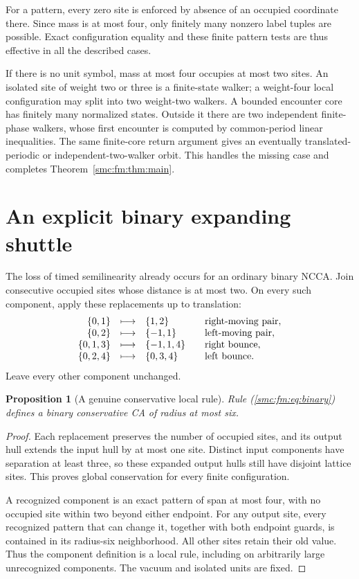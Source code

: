 \documentclass[11pt,letterpaper]{article}
\numberwithin{equation}{section}
\newtheorem{proposition}[theorem]{Proposition}
\theoremstyle{definition}
\theoremstyle{remark}
\begin{document}
For a pattern, every zero site is enforced by absence of an occupied coordinate
there. Since mass is at most four, only finitely many nonzero label tuples are
possible. Exact configuration equality and these finite pattern tests are thus
effective in all the described cases.

If there is no unit symbol, mass at most four occupies at most two sites.
An isolated site of weight two or three is a finite-state walker; a weight-four
local configuration may split into two weight-two walkers. A bounded encounter
core has finitely many normalized states. Outside it there are two independent
finite-phase walkers, whose first encounter is computed by common-period linear
inequalities. The same finite-core return argument gives an eventually
translated-periodic or independent-two-walker orbit. This handles the missing
case and completes Theorem~\ref{smc:fm:thm:main}.

\section{An explicit binary expanding shuttle}\label{smc:fm:sec:binary}
The loss of timed semilinearity already occurs for an ordinary binary NCCA.
Join consecutive occupied sites whose distance is at most two. On every such
component, apply these replacements up to translation:
\begin{equation}
\begin{array}{rcl@{\qquad}l}
\{0,1\}&\longmapsto&\{1,2\}&\text{right-moving pair},\\
\{0,2\}&\longmapsto&\{-1,1\}&\text{left-moving pair},\\
\{0,1,3\}&\longmapsto&\{-1,1,4\}&\text{right bounce},\\
\{0,2,4\}&\longmapsto&\{0,3,4\}&\text{left bounce}.
\end{array}                                                   \label{smc:fm:eq:binary}
\end{equation}
Leave every other component unchanged.

\begin{proposition}[A genuine conservative local rule]\label{smc:fm:prop:rule}
Rule (\ref{smc:fm:eq:binary}) defines a binary conservative CA of radius at most six.
\end{proposition}
\begin{proof}
Each replacement preserves the number of occupied sites, and its output hull
extends the input hull by at most one site. Distinct input components have
separation at least three, so these expanded output hulls still have disjoint
lattice sites. This proves global conservation for every finite configuration.

A recognized component is an exact pattern of span at most four, with no
occupied site within two beyond either endpoint. For any output site, every
recognized pattern that can change it, together with both endpoint guards,
is contained in its radius-six neighborhood. All other sites retain their old
value. Thus the component definition is a local rule, including on arbitrarily
large unrecognized components. The vacuum and isolated units are fixed.
\end{proof}
\end{document}
